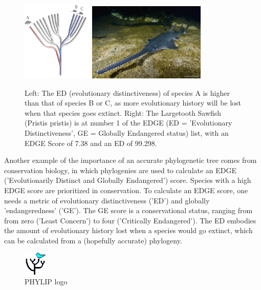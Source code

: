 \begin{figure}[H]
  \includegraphics[width=0.3\textwidth]{edge_tree.png}
  \includegraphics[width=0.5\textwidth]{Pristis-pristis_Simon-Fraser-University-1000x667.jpg}
  \caption{
    Left: The ED (evolutionary distinctiveness)       
    of species A is higher than that of species 
    B or C, as more                             
    evolutionary history will be lost when      
    that species goes extinct.
    Right: The Largetooth Sawfish (Pristis pristis) is at number 1 of the 
    EDGE (ED = 'Evolutionary Distinctiveness', GE = Globally Endangered status) 
    list, with an EDGE Score of 7.38 and an ED of 99.298.
 }
  \label{fig:edge_species}
\end{figure}

Another example of the importance of an accurate phylogenetic tree 
comes from conservation biology, in which phylogenies are used to
calculate an EDGE ('Evolutionarily Distinct and Globally Endangered') 
score. Species with a high EDGE score are prioritized in conservation.
To calculate an EDGE score, one needs a metric of evolutionary 
distinctiveness ('ED') and globally 'endangeredness' ('GE').
The GE score is a conservational status, ranging from from zero ('Least Concern') 
to four ('Critically Endangered'). 
The ED embodies the amount of evolutionary history lost when a species 
would go extinct, which can be calculated from a (hopefully accurate) 
phylogeny.

\begin{figure}[H]
  \includegraphics[width=0.1\textwidth]{phylip.png}
  \caption{
    PHYLIP logo
 }
  \label{fig:phylip}
\end{figure}


